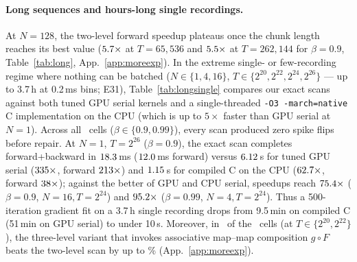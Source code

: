\documentclass[10pt]{article}
\theoremstyle{remark}
\begin{document}
\begin{table}[t]
\centering\small

\caption{One LIF layer, forward+backward, library defaults ($\beta=0.9$, RTX~5090, median of 25 runs). The last two columns give speedups over the serial kernels.}
\label{tab:auto}
\end{table}

\paragraph{Long sequences and hours-long single recordings.}
At $N=128$, the two-level forward speedup plateaus once the chunk length reaches its best value ($5.7\times$ at $T=65{,}536$ and $5.5\times$ at $T=262{,}144$ for $\beta=0.9$, Table~\ref{tab:long}, App.~\ref{app:moreexp}). In the extreme single- or few-recording regime where nothing can be batched ($N\in\{1,4,16\}$, $T\in\{2^{20},2^{22},2^{24},2^{26}\}$ --- up to 3.7\,h at 0.2\,ms bins; E31), Table~\ref{tab:longsingle} compares our exact scans against both tuned GPU serial kernels and a single-threaded \texttt{-O3 -march=native} C implementation on the CPU (which is up to $5\times$ faster than GPU serial at $N=1$). Across all \LongSingleCells\ cells ($\beta\in\{0.9,0.99\}$), every scan produced zero spike flips before repair. At $N=1$, $T=2^{26}$ ($\beta=0.9$), the exact scan completes forward+backward in $18.3$\,ms ($12.0$\,ms forward) versus $6.12$\,s for tuned GPU serial ($335\times$, forward $213\times$) and $1.15$\,s for compiled C on the CPU ($62.7\times$, forward $38\times$); against the better of GPU and CPU serial, speedups reach $75.4\times$ ($\beta=0.9$, $N=16,T=2^{24}$) and $95.2\times$ ($\beta=0.99$, $N=4,T=2^{24}$). Thus a 500-iteration gradient fit on a 3.7\,h single recording drops from 9.5\,min on compiled C (51\,min on GPU serial) to under 10\,s. Moreover, in \LongSingleVFourWins\ of the \LongSingleCells\ cells (at $T\in\{2^{20},2^{22}\}$), the three-level variant that invokes associative map--map composition $g\circ F$ beats the two-level scan by up to \LongSingleVFourMaxGain\% (App.~\ref{app:moreexp}).

\begin{table}[t]
\centering\small
\setlength{\tabcolsep}{4pt}

\caption{Hours-long single and few-trial recordings ($\beta=0.9$, RTX~5090 vs.\ \texttt{-O3 -march=native} single-threaded C on CPU, E31; $T=2^{26}\approx 6.7\times10^7$ steps $\approx 3.7$\,h at 0.2\,ms bins). All cells have $0$ pre-repair spike flips. Last column: ratio of three-level (\texttt{v4}, using map--map composition) to two-level (\texttt{v3}) forward time ($<1$ means three-level wins).}
\label{tab:longsingle}
\end{table}
\end{document}
